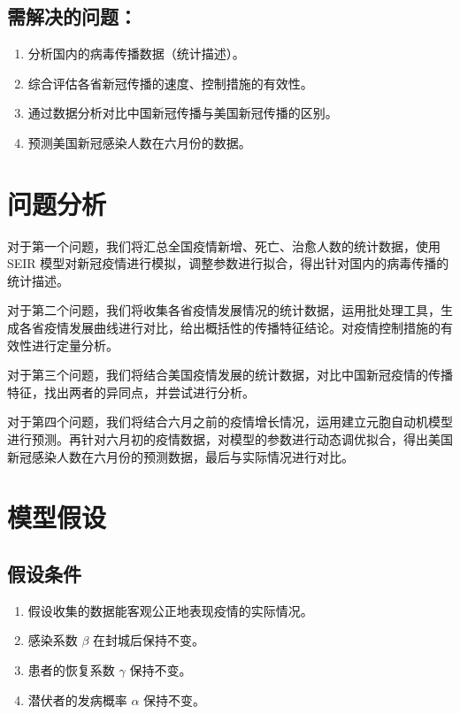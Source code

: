 \documentclass[UTF8]{ctexart}
\begin{document}

\subsection{需解决的问题：}
\begin{enumerate}
    \item 分析国内的病毒传播数据（统计描述）。 
    \item 综合评估各省新冠传播的速度、控制措施的有效性。 
    \item 通过数据分析对比中国新冠传播与美国新冠传播的区别。
    \item 预测美国新冠感染人数在六月份的数据。 
\end{enumerate}
\section{问题分析}
对于第一个问题，我们将汇总全国疫情新增、死亡、治愈人数的统计数据，使用 SEIR 模型对新冠疫情进行模拟，调整参数进行拟合，得出针对国内的病毒传播的统计描述。
\par 对于第二个问题，我们将收集各省疫情发展情况的统计数据，运用批处理工具，生成各省疫情发展曲线进行对比，给出概括性的传播特征结论。对疫情控制措施的有效性进行定量分析。
\par 对于第三个问题，我们将结合美国疫情发展的统计数据，对比中国新冠疫情的传播特征，找出两者的异同点，并尝试进行分析。
\par 对于第四个问题，我们将结合六月之前的疫情增长情况，运用建立元胞自动机模型进行预测。再针对六月初的疫情数据，对模型的参数进行动态调优拟合，得出美国新冠感染人数在六月份的预测数据，最后与实际情况进行对比。


\section{模型假设}
\subsection{假设条件}
\begin{enumerate}
    \item   假设收集的数据能客观公正地表现疫情的实际情况。
    \item 	感染系数 $\beta$ 在封城后保持不变。
    \item 	患者的恢复系数 $\gamma$ 保持不变。
    \item 	潜伏者的发病概率 $\alpha$ 保持不变。
\end{enumerate}
\end{document}
